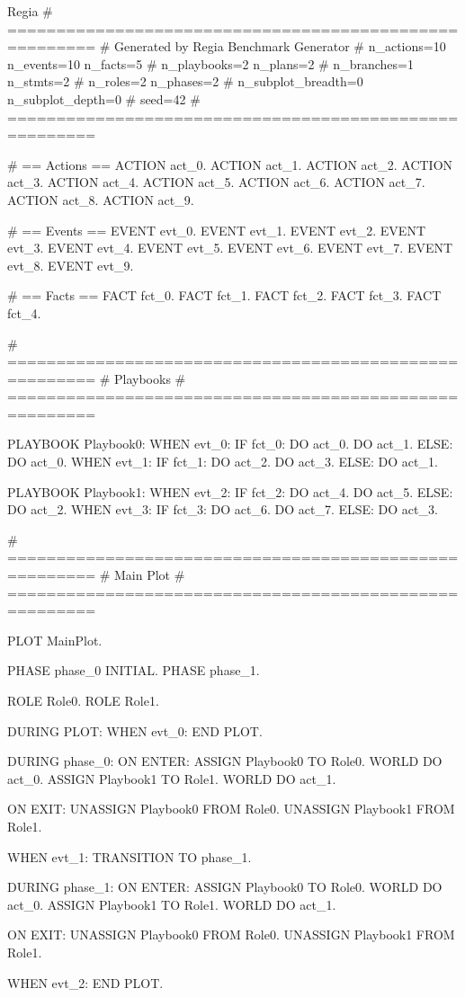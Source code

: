 \begin{codeblock}[]{Regia}
# =======================================================
# Generated by Regia Benchmark Generator
# n_actions=10  n_events=10  n_facts=5
# n_playbooks=2  n_plans=2
# n_branches=1  n_stmts=2
# n_roles=2  n_phases=2
# n_subplot_breadth=0  n_subplot_depth=0
# seed=42
# =======================================================

# == Actions ==
ACTION act_0.
ACTION act_1.
ACTION act_2.
ACTION act_3.
ACTION act_4.
ACTION act_5.
ACTION act_6.
ACTION act_7.
ACTION act_8.
ACTION act_9.

# == Events ==
EVENT evt_0.
EVENT evt_1.
EVENT evt_2.
EVENT evt_3.
EVENT evt_4.
EVENT evt_5.
EVENT evt_6.
EVENT evt_7.
EVENT evt_8.
EVENT evt_9.

# == Facts ==
FACT fct_0.
FACT fct_1.
FACT fct_2.
FACT fct_3.
FACT fct_4.

# =======================================================
# Playbooks
# =======================================================

PLAYBOOK Playbook0:
    WHEN evt_0:
        IF fct_0:
            DO act_0.
            DO act_1.
        ELSE:
            DO act_0.
    WHEN evt_1:
        IF fct_1:
            DO act_2.
            DO act_3.
        ELSE:
            DO act_1.

PLAYBOOK Playbook1:
    WHEN evt_2:
        IF fct_2:
            DO act_4.
            DO act_5.
        ELSE:
            DO act_2.
    WHEN evt_3:
        IF fct_3:
            DO act_6.
            DO act_7.
        ELSE:
            DO act_3.

# =======================================================
# Main Plot
# =======================================================

PLOT MainPlot.

    PHASE phase_0 INITIAL.
    PHASE phase_1.

    ROLE Role0.
    ROLE Role1.

    DURING PLOT:
        WHEN evt_0:
            END PLOT.

    DURING phase_0:
        ON ENTER:
            ASSIGN Playbook0 TO Role0.
            WORLD DO act_0.
            ASSIGN Playbook1 TO Role1.
            WORLD DO act_1.

        ON EXIT:
            UNASSIGN Playbook0 FROM Role0.
            UNASSIGN Playbook1 FROM Role1.

        WHEN evt_1:
            TRANSITION TO phase_1.

    DURING phase_1:
        ON ENTER:
            ASSIGN Playbook0 TO Role0.
            WORLD DO act_0.
            ASSIGN Playbook1 TO Role1.
            WORLD DO act_1.

        ON EXIT:
            UNASSIGN Playbook0 FROM Role0.
            UNASSIGN Playbook1 FROM Role1.

        WHEN evt_2:
            END PLOT.
\end{codeblock}
